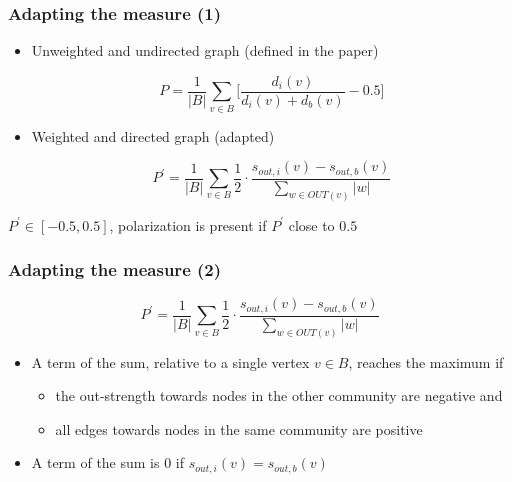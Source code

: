 \documentclass{beamer}
\begin{document}
    \begin{frame}[c]
        \frametitle{Adapting the measure (1)}

        \begin{itemize}
        \item Unweighted and undirected graph (defined in the paper)

        \begin{equation}
            P = \frac{1}{|B|} \sum^{}_{v \in B} \bigg[ \frac{d_i(v)}{d_i(v) +
            d_b(v)} - 0.5 \bigg]
        \end{equation}

        \item Weighted and directed graph (adapted)

        \begin{equation}
            P^{'}  = \frac{1}{|B|} \sum^{}_{v \in B} 
            \frac{1}{2} \cdot \frac{s_{out,i} (v) - s_{out,b}(v)}
            { \sum^{}_{w \in OUT(v) } |w |} 
        \end{equation}
        \end{itemize}

        $P ^{'} \in [-0.5, 0.5]$, polarization is present if $P^{'} $ close to $0.5$

    \end{frame}

    \begin{frame}[c]
        \frametitle{Adapting the measure (2)}
        
        \begin{equation*}
            P^{'}  = \frac{1}{|B|} \sum^{}_{v \in B} 
            \frac{1}{2} \cdot \frac{s_{out,i} (v) - s_{out,b}(v)}
            { \sum^{}_{w \in OUT(v) } |w |} 
        \end{equation*}

        \begin{itemize}
            \item A term of the sum, relative to a single vertex $v \in B$,
                reaches the maximum if 
                \begin{itemize}
                    \item the out-strength towards nodes in the other community are negative and 
                    \item all edges towards nodes in the same community are
                        positive
                \end{itemize}
            \item A term of the sum is $0$ if $s_{out,i} (v) = s_{out,b}(v)$
        \end{itemize}
    \end{frame}
\end{document}
